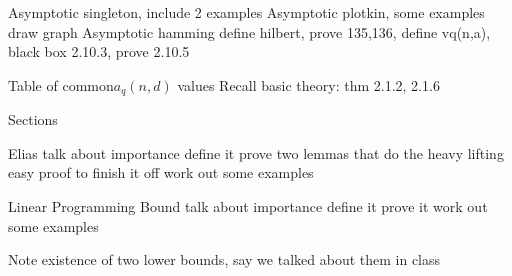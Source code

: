 \documentclass{article}
\numberwithin{theorem}{subsection}
\theoremstyle{definition}
\numberwithin{exmp}{subsection}
\theoremstyle{definition}
\numberwithin{defn}{subsection}
\theoremstyle{definition}
\numberwithin{claim}{subsection}
\begin{document}
Asymptotic singleton, include 2 examples
Asymptotic plotkin, some examples
draw graph
Asymptotic hamming
	define hilbert, prove 135,136, define vq(n,a),
	black box 2.10.3, prove 2.10.5


Table of common$a_q(n,d)$ values
Recall basic theory: thm 2.1.2, 2.1.6

Sections


Elias
talk about importance
define it
prove two lemmas that do the heavy lifting
easy proof to finish it off
work out some examples

Linear Programming Bound
talk about importance
define it
prove it
work out some examples


Note existence of two lower bounds, say we talked about them in class
\end{document}
